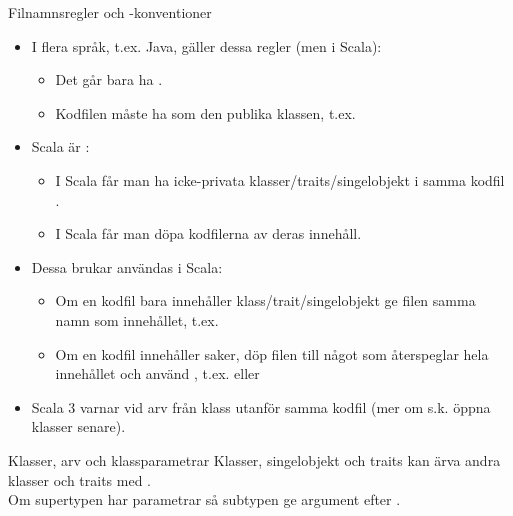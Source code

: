 \begin{Slide}{Filnamnsregler och -konventioner}\SlideFontSmall
\begin{itemize}
\item I flera språk, t.ex. Java, gäller dessa regler (men  i Scala):
\begin{itemize}\SlideFontTiny
\item Det går bara ha .
\item Kodfilen måste ha  som den publika klassen, t.ex. 
\end{itemize}
\item Scala är :
\begin{itemize}\SlideFontTiny
\item I Scala får man ha  icke-privata klasser/traits/singelobjekt i samma kodfil .
\item I Scala får man döpa kodfilerna  av deras innehåll. \pause 
\end{itemize}

\item Dessa  brukar användas i Scala:
\begin{itemize}\SlideFontTiny
\item Om en kodfil bara innehåller  klass/trait/singelobjekt ge filen samma namn som innehållet, t.ex. 
\item Om en kodfil innehåller  saker, döp filen till något som återspeglar hela innehållet och använd , t.ex.  eller 
\end{itemize}
\item Scala 3 varnar vid arv från klass utanför samma kodfil (mer om s.k. öppna klasser senare).
\end{itemize}
\end{Slide}


\begin{Slide}{Klasser, arv och klassparametrar}\SlideFontTiny
Klasser, singelobjekt och traits kan ärva andra klasser och traits med .\\Om supertypen har parametrar så  subtypen ge argument efter .

\ifkompendium
{}
\else
{}
\fi 
\end{Slide}


